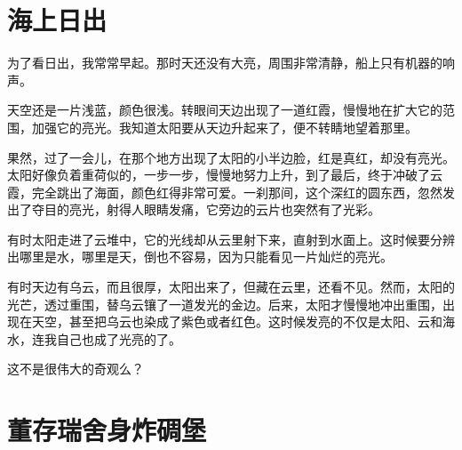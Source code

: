 \documentclass[12pt,UTF-8,openany]{ctexbook}
\begin{document}
\chapter{海上日出}

\begin{large}
    
    为了看日出，我常常早起。那时天还没有大亮，周围非常清静，船上只有机器的响声。
    
    天空还是一片浅蓝，颜色很浅。转眼间天边出现了一道红霞，慢慢地在扩大它的范围，加强它的亮光。我知道太阳要从天边升起来了，便不转睛地望着那里。
    
    果然，过了一会儿，在那个地方出现了太阳的小半边脸，红是真红，却没有亮光。太阳好像负着重荷似的，一步一步，慢慢地努力上升，到了最后，终于冲破了云霞，完全跳出了海面，颜色红得非常可爱。一刹那间，这个深红的圆东西，忽然发出了夺目的亮光，射得人眼睛发痛，它旁边的云片也突然有了光彩。
    
    有时太阳走进了云堆中，它的光线却从云里射下来，直射到水面上。这时候要分辨出哪里是水，哪里是天，倒也不容易，因为只能看见一片灿烂的亮光。
    
    有时天边有乌云，而且很厚，太阳出来了，但藏在云里，还看不见。然而，太阳的光芒，透过重围，替乌云镶了一道发光的金边。后来，太阳才慢慢地冲出重围，出现在天空，甚至把乌云也染成了紫色或者红色。这时候发亮的不仅是太阳、云和海水，连我自己也成了光亮的了。
    
    这不是很伟大的奇观么？
    
\end{large}



\chapter{董存瑞舍身炸碉堡}
\end{document}
